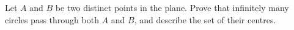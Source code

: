 Let $A$ and $B$ be two distinct points in the plane. Prove that infinitely many circles pass through both $A$ and $B$, and describe the set of their centres.
